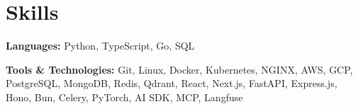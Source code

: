 \section{Skills}

\begin{onecolentry}
    \textbf{Languages:} Python, TypeScript, Go, SQL
\end{onecolentry}

\vspace{0.1 cm}

\begin{onecolentry}
    \textbf{Tools \& Technologies:} Git, Linux, Docker, Kubernetes, NGINX, AWS, GCP, PostgreSQL, MongoDB, Redis, Qdrant, React, Next.js, FastAPI, Express.js, Hono, Bun, Celery, PyTorch, AI SDK, MCP, Langfuse
\end{onecolentry}
